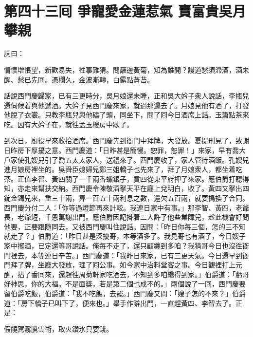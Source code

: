 
\chapter*{第四十三囘 爭寵愛金蓮惹氣 賣富貴吳月攀親}


詞曰：

\begin{myquote}
情懷增悵望，新歡易失，徃事難猜。問籬邊黃菊，知為誰開？謾道愁須滯酒，酒未醒、愁已先囘。憑欄久，金波漸轉，白露點蒼苔。

\end{myquote}

話說西門慶歸家，已有三更時分，吳月娘還未睡，正和吳大妗子衆人說話，李瓶兒還伺候着與他遞酒。大妗子見西門慶來家，就過那邊去了。月娘見他有酒了，打發他脫了衣裳。只教李瓶兒與他磕了頭，同坐下，問了囘今日酒席上話。玉簫點茶來吃。因有大妗子在，就徃孟玉樓房中歇了。

到次日，廚役早來收拾酒席。西門慶先到衙門中拜牌，大發放。夏提刑見了，致謝日昨房下厚擾之意。西門慶道：「日昨甚是簡慢。恕罪，恕罪！」來家，早有喬大戶家使孔嫂兒引了喬五太太家人，送禮來了。西門慶收了，家人管待酒飯。孔嫂兒進月娘房裡坐的。吳舜臣媳婦兒鄭三姐轎子也先來了，拜了月娘衆人，都坐着吃茶。正值李智、黃四關了一千兩香蠟銀子，賁四從東平府押了來家。應伯爵打聽得知，亦走來幫扶交納。西門慶令陳敬濟拏天平在廳上兌明白，收了。黃四又拏出四錠金鐲兒來，重三十兩，算一百五十兩利息之數，還欠五百兩，就要搗換了合同。西門慶分付二人：「你等過燈節再來計較。我連日家中有事。」那李智、黃四，老爺長，老爺短，千恩萬謝出門。應伯爵因記掛着二人許了他些業障兒，趁此機會好問他要，正要跟隨同去，又被西門慶叫住說話。因問：「昨日你每三個，怎的三不知就走了？」伯爵道：「昨日甚是深擾哥，本等酒多了。我見哥也有酒了，今日嫂子家中擺酒，已定還等哥說話。俺每不走了，還只顧纏到多咱？我猜哥今日也沒徃衙門裡去，本等連日辛苦。」西門慶道：「我昨日來家，已有三更天氣。今日還早到衙門拜了牌，坐廳大發放，理了囘公事。如今家中治料堂客之事。今日觀裡打上元醮，拈了香囘來，還趕徃周菊軒家吃酒去，不知到多咱纔得到家。」伯爵道：「虧哥好神思，你的大福。不是面獎，若是第二個也成不的。」{}兩個說了一囘，西門慶要留伯爵吃飯，伯爵道：「我不吃飯，去罷。」西門慶又問：「嫂子怎的不來？」伯爵道：「房下轎子已叫下了，便來也。」舉手作辭出門，一直趕黃四、李智去了。正是：

\begin{myquote}
假饒駕霧騰雲術，取火鑽氷只要錢。
\end{myquote}

